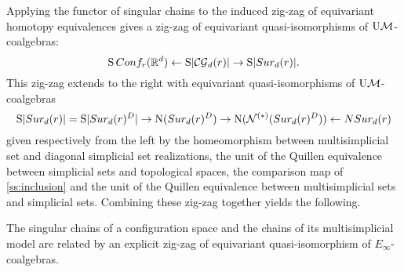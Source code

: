Applying the functor of singular chains to the induced zig-zag of equivariant homotopy equivalences gives a zig-zag of equivariant quasi-isomorphisms of $\mathrm{U}\mathcal{M}$-coalgebras:
\[
\operatorname{S}Conf_{r}(\mathbb{R}^d) \leftarrow \operatorname{S}\lvert\mathcal{CG}_{d}(r)\rvert \to \operatorname{S}\lvert Sur_{d}(r)\rvert.
\]
This zig-zag extends to the right with equivariant quasi-isomorphisms of $\mathrm{U}\mathcal{M}$-coalgebras
\[
\operatorname{S}\lvert Sur_{d}(r)\rvert= \operatorname{S} \lvert Sur_{d}(r)^{D}\rvert \to \operatorname{N}(Sur_{d}(r)^D) \to \operatorname{N}(\mathcal{N}^{(*)}(Sur_{d}(r)^D)) \leftarrow NSur_{d}(r)
\]
given respectively from the left by the homeomorphism between multisimplicial set and diagonal simplicial set realizations, the unit of the Quillen equivalence between simplicial sets and topological spaces, the comparison map of \cref{ss:inclusion} and the unit of the Quillen equivalence between multisimplicial sets and simplicial sets.
Combining these zig-zag together yields the following.

\begin{theorem}
	The singular chains of a configuration space and the chains of its multisimplicial model are related by an explicit zig-zag of equivariant quasi-isomorphism of $E_\infty$-coalgebras.
\end{theorem}

%
